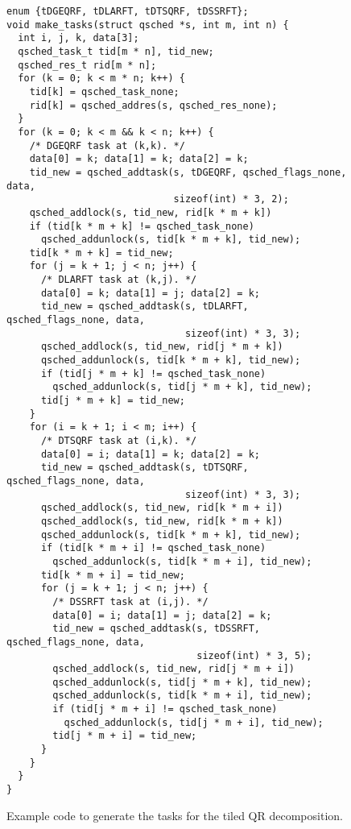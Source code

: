 \documentclass[fleqn,10pt]{wlpeerj}
\begin{document}
\begin{figure}
\begin{center}\begin{minipage}{0.9\textwidth}
    \begin{lstlisting}[basicstyle=\scriptsize\tt]
enum {tDGEQRF, tDLARFT, tDTSQRF, tDSSRFT};
void make_tasks(struct qsched *s, int m, int n) {
  int i, j, k, data[3];
  qsched_task_t tid[m * n], tid_new;
  qsched_res_t rid[m * n];
  for (k = 0; k < m * n; k++) {
    tid[k] = qsched_task_none;
    rid[k] = qsched_addres(s, qsched_res_none);
  }
  for (k = 0; k < m && k < n; k++) {
    /* DGEQRF task at (k,k). */
    data[0] = k; data[1] = k; data[2] = k;
    tid_new = qsched_addtask(s, tDGEQRF, qsched_flags_none, data,
                             sizeof(int) * 3, 2);
    qsched_addlock(s, tid_new, rid[k * m + k])
    if (tid[k * m + k] != qsched_task_none)
      qsched_addunlock(s, tid[k * m + k], tid_new);
    tid[k * m + k] = tid_new;
    for (j = k + 1; j < n; j++) {
      /* DLARFT task at (k,j). */
      data[0] = k; data[1] = j; data[2] = k;
      tid_new = qsched_addtask(s, tDLARFT, qsched_flags_none, data,
                               sizeof(int) * 3, 3);
      qsched_addlock(s, tid_new, rid[j * m + k])
      qsched_addunlock(s, tid[k * m + k], tid_new);
      if (tid[j * m + k] != qsched_task_none)
        qsched_addunlock(s, tid[j * m + k], tid_new);
      tid[j * m + k] = tid_new;
    }
    for (i = k + 1; i < m; i++) {
      /* DTSQRF task at (i,k). */
      data[0] = i; data[1] = k; data[2] = k;
      tid_new = qsched_addtask(s, tDTSQRF, qsched_flags_none, data,
                               sizeof(int) * 3, 3);
      qsched_addlock(s, tid_new, rid[k * m + i])
      qsched_addlock(s, tid_new, rid[k * m + k])
      qsched_addunlock(s, tid[k * m + k], tid_new);
      if (tid[k * m + i] != qsched_task_none)
        qsched_addunlock(s, tid[k * m + i], tid_new);
      tid[k * m + i] = tid_new;
      for (j = k + 1; j < n; j++) {
        /* DSSRFT task at (i,j). */
        data[0] = i; data[1] = j; data[2] = k;
        tid_new = qsched_addtask(s, tDSSRFT, qsched_flags_none, data,
                                 sizeof(int) * 3, 5);
        qsched_addlock(s, tid_new, rid[j * m + i])
        qsched_addunlock(s, tid[j * m + k], tid_new);
        qsched_addunlock(s, tid[k * m + i], tid_new);
        if (tid[j * m + i] != qsched_task_none)
          qsched_addunlock(s, tid[j * m + i], tid_new);
        tid[j * m + i] = tid_new;
      }
    }
  }
}
    \end{lstlisting}
\end{minipage}\end{center}
\caption{Example code to generate the tasks for the tiled
    QR decomposition.}
\label{fig:CodeQR}
\end{figure}
\end{document}
